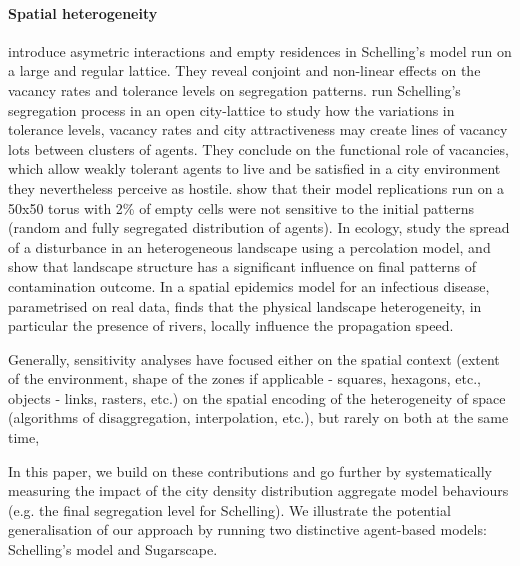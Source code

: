 \documentclass[preprint,5p,times,twocolumn,authoryear]{elsarticle}
\begin{document}
\paragraph{Spatial heterogeneity} \citet{StaufferSolomon2007} introduce asymetric interactions and empty residences in Schelling's model run on a large and regular lattice. They reveal conjoint and non-linear effects on the vacancy rates and tolerance levels on segregation patterns. \citet{Gauvinetal2010} run Schelling's segregation process in an open city-lattice to study how the variations in tolerance levels, vacancy rates and city attractiveness may create lines of vacancy lots between clusters of agents. They conclude on the functional role of vacancies, which allow weakly tolerant agents to live and be satisfied in a city environment they nevertheless perceive as hostile. \citet{HatnaBenenson2012} show that their model replications run on a 50x50 torus with 2\% of empty cells were not sensitive to the initial patterns (random and fully segregated distribution of agents). In ecology, \citet{smith2002predicting} study the spread of a disturbance in an heterogeneous landscape using a percolation model, and show that landscape structure has a significant influence on final patterns of contamination outcome. In a spatial epidemics model for an infectious disease, parametrised on real data, \citet{smith2002predicting} finds that the physical landscape heterogeneity, in particular the presence of rivers, locally influence the propagation speed.


 Generally, sensitivity analyses have focused either on the spatial context (extent of the environment, shape of the zones if applicable - squares, hexagons, etc., objects - links, rasters, etc.)  on the spatial encoding of the heterogeneity of space (algorithms of disaggregation, interpolation, etc.), but rarely on both at the same time,  
 
 


In this paper, we build on these contributions and go further by systematically measuring the impact of the city density distribution aggregate model behaviours (e.g. the final segregation level for Schelling). We illustrate the potential generalisation of our approach by running two distinctive agent-based models: Schelling's model and Sugarscape.
\end{document}
